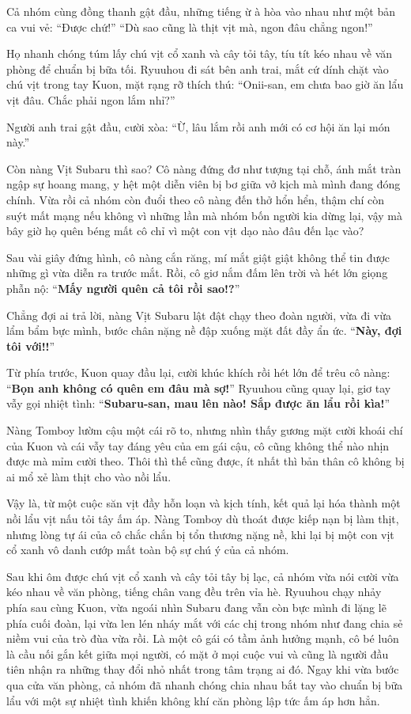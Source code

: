 \documentclass[../main.tex]{subfiles}
\begin{document}
Cả nhóm cùng đồng thanh gật đầu, những tiếng ừ à hòa vào nhau như một bản ca vui vẻ: ``Được chứ!'' ``Dù sao cũng là thịt vịt mà, ngon đâu chẳng ngon!''

Họ nhanh chóng túm lấy chú vịt cổ xanh và cây tỏi tây, tíu tít kéo nhau về văn phòng để chuẩn bị bữa tối. Ryuuhou đi sát bên anh trai, mắt cứ dính chặt vào chú vịt trong tay Kuon, mặt rạng rỡ thích thú: ``Onii-san, em chưa bao giờ ăn lẩu vịt đâu. Chắc phải ngon lắm nhỉ?''

Người anh trai gật đầu, cười xòa: ``Ừ, lâu lắm rồi anh mới có cơ hội ăn lại món này.''

Còn nàng Vịt Subaru thì sao? Cô nàng đứng đơ như tượng tại chỗ, ánh mắt tràn ngập sự hoang mang, y hệt một diễn viên bị bơ giữa vở kịch mà mình đang đóng chính. Vừa rồi cả nhóm còn đuổi theo cô nàng đến thở hổn hển, thậm chí còn suýt mất mạng nếu không vì những lần mà nhóm bốn người kia dừng lại, vậy mà bây giờ họ quên béng mất cô chỉ vì một con vịt dạo nào đâu đến lạc vào?

Sau vài giây đứng hình, cô nàng cắn răng, mí mắt giật giật không thể tin được những gì vừa diễn ra trước mắt. Rồi, cô giơ nắm đấm lên trời và hét lớn giọng phẫn nộ: ``\textbf{Mấy người quên cả tôi rồi sao!?}''

Chẳng đợi ai trả lời, nàng Vịt Subaru lật đật chạy theo đoàn người, vừa đi vừa lẩm bẩm bực mình, bước chân nặng nề đập xuống mặt đất đầy ẩn ức. ``\textbf{Này, đợi tôi với!!}''

Từ phía trước, Kuon quay đầu lại, cười khúc khích rồi hét lớn để trêu cô nàng: ``\textbf{Bọn anh không có quên em đâu mà sợ!}'' Ryuuhou cũng quay lại, giơ tay vẫy gọi nhiệt tình: ``\textbf{Subaru-san, mau lên nào! Sắp được ăn lẩu rồi kìa!}''

Nàng Tomboy lườm cậu một cái rõ to, nhưng nhìn thấy gương mặt cười khoái chí của Kuon và cái vẫy tay đáng yêu của em gái cậu, cô cũng không thể nào nhịn được mà mỉm cười theo. Thôi thì thế cũng được, ít nhất thì bản thân cô không bị ai mổ xẻ làm thịt cho vào nồi lẩu.

Vậy là, từ một cuộc săn vịt đầy hỗn loạn và kịch tính, kết quả lại hóa thành một nồi lẩu vịt nấu tỏi tây ấm áp. Nàng Tomboy dù thoát được kiếp nạn bị làm thịt, nhưng lòng tự ái của cô chắc chắn bị tổn thương nặng nề, khi lại bị một con vịt cổ xanh vô danh cướp mất toàn bộ sự chú ý của cả nhóm.
\omk

Sau khi ôm được chú vịt cổ xanh và cây tỏi tây bị lạc, cả nhóm vừa nói cười vừa kéo nhau về văn phòng, tiếng chân vang đều trên vỉa hè. Ryuuhou chạy nhảy phía sau cùng Kuon, vừa ngoái nhìn Subaru đang vẫn còn bực mình đi lặng lẽ phía cuối đoàn, lại vừa len lén nháy mắt với các chị trong nhóm như đang chia sẻ niềm vui của trò đùa vừa rồi. Là một cô gái có tầm ảnh hưởng mạnh, cô bé luôn là cầu nối gắn kết giữa mọi người, có mặt ở mọi cuộc vui và cũng là người đầu tiên nhận ra những thay đổi nhỏ nhất trong tâm trạng ai đó. Ngay khi vừa bước qua cửa văn phòng, cả nhóm đã nhanh chóng chia nhau bắt tay vào chuẩn bị bữa lẩu với một sự nhiệt tình khiến không khí căn phòng lập tức ấm áp hơn hẳn.
\end{document}
